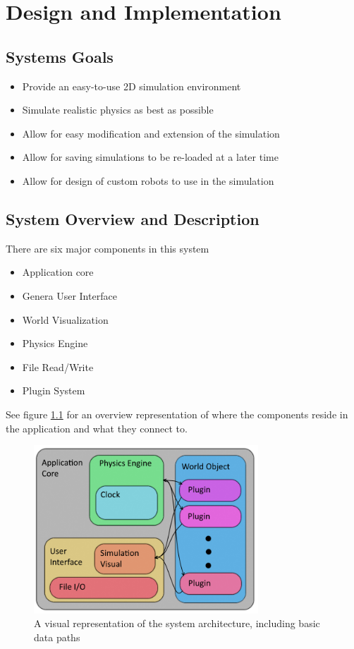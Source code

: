 

\chapter{Design  and Implementation}

\section{Systems Goals}
\begin{itemize}
	\item Provide an easy-to-use 2D simulation environment
	\item Simulate realistic physics as best as possible
	\item Allow for easy modification and extension of the simulation
	\item Allow for saving simulations to be re-loaded at a later time
	\item Allow for design of custom robots to use in the simulation
\end{itemize}

\section{System Overview and Description}
There are six major components in this system
\begin{itemize}
	\item Application core
	\item Genera User Interface
	\item World Visualization
	\item Physics Engine
	\item File Read/Write
	\item Plugin System
\end{itemize}
See figure \ref{fig:systemdiagram} for an overview representation of where the components reside in the application and what they connect to.

\begin{figure}[tbh]
\begin{center}
\includegraphics[width=0.75\textwidth]{./images_design/sysarch}
\end{center}
\caption{A visual representation of the system architecture, including basic data paths\label{fig:systemdiagram}}
\end{figure}


